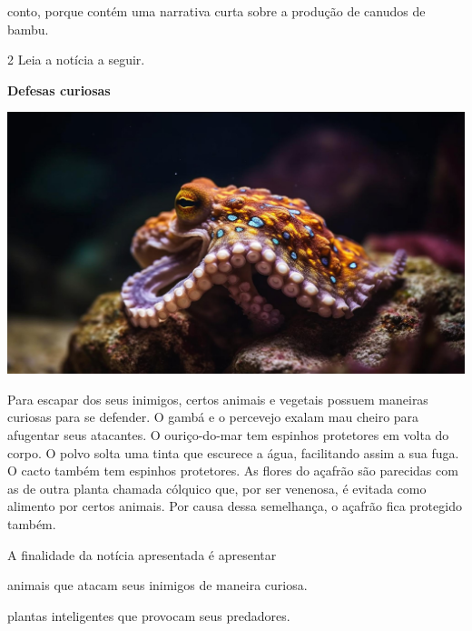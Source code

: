 \begin{conteudo}
\begin{conteudo}
\begin{conteudo}
\begin{conteudo}
\begin{escolha}
\item conto, porque contém uma narrativa curta sobre a produção de canudos de bambu.
\end{escolha}

\num{2} Leia a notícia a seguir.

\begin{myquote}
\textbf{Defesas curiosas}

\begin{center}
\noindent\includegraphics[width=\textwidth]{media/image20d.jpg}
\end{center}

Para escapar dos seus inimigos, certos animais e vegetais possuem
maneiras curiosas para se defender. O gambá e o percevejo exalam mau
cheiro para afugentar seus atacantes. O ouriço-do-mar tem espinhos
protetores em volta do corpo. O polvo solta uma tinta que escurece a
água, facilitando assim a sua fuga. O cacto também tem espinhos
protetores. As flores do açafrão são parecidas com as de outra planta
chamada cólquico que, por ser venenosa, é evitada como alimento por
certos animais. Por causa dessa semelhança, o açafrão fica protegido
também.

\end{myquote}

A finalidade da notícia apresentada é apresentar

\begin{escolha}
\item animais que atacam seus inimigos de maneira curiosa.

\item plantas inteligentes que provocam seus predadores.


\end{escolha}
\end{conteudo}
\end{conteudo}
\end{conteudo}
\end{conteudo}
